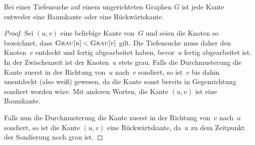 \begin{thm}
Bei einer Tiefensuche auf einem ungerichteten Graphen $G$ ist jede Kante entweder eine Baumkante oder eine Rückwärtskante.
\end{thm}

\begin{proof}
Sei $(u,v)$ eine beliebige Kante von~$G$ und seien die Knoten so bezeichnet, dass $\mathop{\text{\textsc{Grau}}}[u] < \mathop{\text{\textsc{Grau}}}[v]$ gilt.
Die Tiefensuche muss daher den Knoten~$v$ entdeckt und fertig abgearbeitet haben, bevor~$u$ fertig abgearbeitet ist.
In der Zwischenzeit ist der Knoten~$u$ stets grau.
Falls die Durchmusterung die Kante zuerst in der Richtung von~$u$ nach~$v$ sondiert, so ist~$v$ bis dahin unentdeckt (also weiß) gewesen, da die Kante sonst bereits in Gegenrichtung sondiert worden wäre.
Mit anderen Worten, die Kante $(u,v)$ ist eine Baumkante.

Falls nun die Durchmusterung die Kante zuerst in der Richtung von~$v$ nach~$u$ sondiert, so ist die Kante $(u,v)$ eine Rückwärtskante, da~$u$ zu dem Zeitpunkt der Sondierung noch grau ist.
\end{proof}


